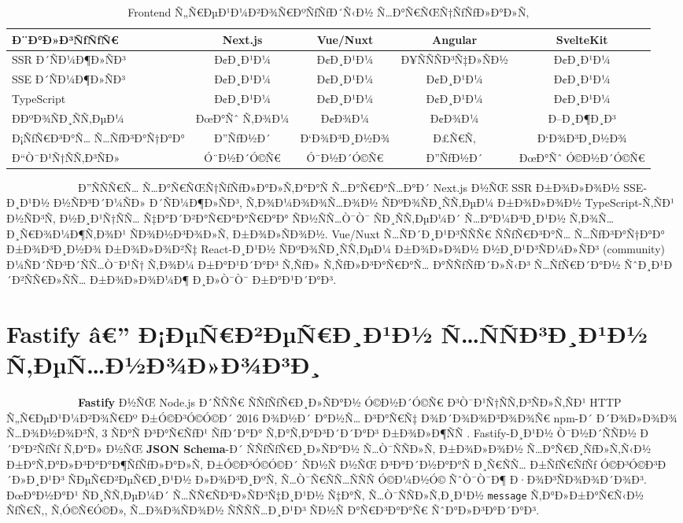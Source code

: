 \documentclass[12pt,A4]{report}
\begin{document}
\begin{table}[h]
\centering
\caption{Frontend Ñ„Ñ€ÐµÐ¹Ð¼Ð²Ð¾Ñ€ÐºÑƒÑƒÐ´Ñ‹Ð½ Ñ…Ð°Ñ€ÑŒÑ†ÑƒÑƒÐ»Ð°Ð»Ñ‚}
\begin{tabular}{|l|c|c|c|c|}
\hline
\textbf{Ð¨Ð°Ð»Ð³ÑƒÑƒÑ€} & \textbf{Next.js} & \textbf{Vue/Nuxt} &
\textbf{Angular} & \textbf{SvelteKit} \\
\hline
SSR Ð´ÑÐ¼Ð¶Ð»ÑÐ³        & Ð¢Ð¸Ð¹Ð¼   & Ð¢Ð¸Ð¹Ð¼   & Ð¥ÑÑÑÐ³Ñ‡Ð»ÑÐ½ & Ð¢Ð¸Ð¹Ð¼ \\
SSE Ð´ÑÐ¼Ð¶Ð»ÑÐ³        & Ð¢Ð¸Ð¹Ð¼   & Ð¢Ð¸Ð¹Ð¼   & Ð¢Ð¸Ð¹Ð¼       & Ð¢Ð¸Ð¹Ð¼ \\
TypeScript         & Ð¢Ð¸Ð¹Ð¼   & Ð¢Ð¸Ð¹Ð¼   & Ð¢Ð¸Ð¹Ð¼       & Ð¢Ð¸Ð¹Ð¼ \\
Ð­ÐºÐ¾ÑÐ¸ÑÑ‚ÐµÐ¼          & ÐœÐ°Ñˆ Ñ‚Ð¾Ð¼ & Ð¢Ð¾Ð¼    & Ð¢Ð¾Ð¼        & Ð–Ð¸Ð¶Ð¸Ð³ \\
Ð¡ÑƒÑ€Ð³Ð°Ñ… Ñ…ÑƒÐ³Ð°Ñ†Ð°Ð°     & Ð”ÑƒÐ½Ð´   & Ð‘Ð¾Ð³Ð¸Ð½Ð¾ & Ð£Ñ€Ñ‚        & Ð‘Ð¾Ð³Ð¸Ð½Ð¾ \\
Ð“Ò¯Ð¹Ñ†ÑÑ‚Ð³ÑÐ»         & Ó¨Ð½Ð´Ó©Ñ€  & Ó¨Ð½Ð´Ó©Ñ€  & Ð”ÑƒÐ½Ð´       & ÐœÐ°Ñˆ Ó©Ð½Ð´Ó©Ñ€ \\
\hline
\end{tabular}
\label{tab:frontend_comparison}
\end{table}

\ \ \ \ \ \ \ \ \  \ \ \ \ Ð”ÑÑÑ€Ñ… Ñ…Ð°Ñ€ÑŒÑ†ÑƒÑƒÐ»Ð°Ð»Ñ‚Ð°Ð°Ñ Ñ…Ð°Ñ€Ð°Ñ…Ð°Ð´ Next.js Ð½ÑŒ
SSR Ð±Ð¾Ð»Ð¾Ð½ SSE-Ð¸Ð¹Ð½ Ð½ÑÐ³Ð´Ð¼ÑÐ» Ð´ÑÐ¼Ð¶Ð»ÑÐ³, Ñ‚Ð¾Ð¼Ð¾Ð¾Ñ…Ð¾Ð½ ÑÐºÐ¾ÑÐ¸ÑÑ‚ÐµÐ¼ Ð±Ð¾Ð»Ð¾Ð½
TypeScript-Ñ‚ÑÐ¹ Ð½ÑÐ³Ñ‚ Ð½Ð¸Ð¹Ñ†ÑÑ… Ñ‡Ð°Ð´Ð²Ð°Ñ€Ð°Ð°Ñ€Ð°Ð° ÑÐ½ÑÑ…Ò¯Ò¯ ÑÐ¸ÑÑ‚ÐµÐ¼Ð´ Ñ…Ð°Ð¼Ð³Ð¸Ð¹Ð½
Ñ‚Ð¾Ñ…Ð¸Ñ€Ð¾Ð¼Ð¶Ñ‚Ð¾Ð¹ ÑÐ¾Ð½Ð³Ð¾Ð»Ñ‚ Ð±Ð¾Ð»ÑÐ¾Ð½. Vue/Nuxt Ñ…ÑÐ´Ð¸Ð¹Ð³ÑÑÑ€ ÑÑƒÑ€Ð³Ð°Ñ… Ñ…ÑƒÐ³Ð°Ñ†Ð°Ð° Ð±Ð¾Ð³Ð¸Ð½Ð¾
Ð±Ð¾Ð»Ð¾Ð²Ñ‡ React-Ð¸Ð¹Ð½ ÑÐºÐ¾ÑÐ¸ÑÑ‚ÐµÐ¼ Ð±Ð¾Ð»Ð¾Ð½ Ð½Ð¸Ð¹Ð³ÑÐ¼Ð»ÑÐ³ (community) Ð¼ÑÐ´ÑÐ³Ð´ÑÑ…Ò¯Ð¹Ñ†
Ñ‚Ð¾Ð¼ Ð±Ð°Ð¹Ð´Ð°Ð³ Ñ‚ÑƒÐ» Ñ‚ÑƒÐ»Ð³Ð°Ñ€Ð°Ñ… Ð°ÑÑƒÑƒÐ´Ð»Ñ‹Ð³ Ñ…ÑƒÑ€Ð´Ð°Ð½ ÑˆÐ¸Ð¹Ð´Ð²ÑÑ€Ð»ÑÑ… Ð±Ð¾Ð»Ð¾Ð¼Ð¶ Ð¸Ð»Ò¯Ò¯
Ð±Ð°Ð¹Ð´Ð°Ð³.

\section{Fastify â€” Ð¡ÐµÑ€Ð²ÐµÑ€Ð¸Ð¹Ð½ Ñ…ÑÑÐ³Ð¸Ð¹Ð½ Ñ‚ÐµÑ…Ð½Ð¾Ð»Ð¾Ð³Ð¸}

\ \ \ \ \ \ \ \ \  \ \ \ \ \textbf{Fastify} Ð½ÑŒ Node.js Ð´ÑÑÑ€ ÑÑƒÑƒÑ€Ð¸Ð»ÑÐ°Ð½
Ó©Ð½Ð´Ó©Ñ€ Ð³Ò¯Ð¹Ñ†ÑÑ‚Ð³ÑÐ»Ñ‚ÑÐ¹ HTTP Ñ„Ñ€ÐµÐ¹Ð¼Ð²Ð¾Ñ€Ðº Ð±Ó©Ð³Ó©Ó©Ð´ 2016 Ð¾Ð½Ð´ Ð°Ð½Ñ… Ð³Ð°Ñ€Ñ‡
Ð¾Ð´Ð¾Ð¾Ð³Ð¾Ð¾Ñ€ npm-Ð´ Ð´Ð¾Ð»Ð¾Ð¾ Ñ…Ð¾Ð½Ð¾Ð³Ñ‚ 3 ÑÐ°Ñ Ð³Ð°Ñ€ÑƒÐ¹ ÑƒÐ´Ð°Ð° Ñ‚Ð°Ñ‚Ð°Ð³Ð´Ð´Ð°Ð³ Ð±Ð¾Ð»Ð¶ÑÑ
\cite{fastify2024}. Fastify-Ð¸Ð¹Ð½ Ò¯Ð½Ð´ÑÑÐ½ Ð´Ð°Ð²ÑƒÑƒ Ñ‚Ð°Ð» Ð½ÑŒ
\textbf{JSON Schema}-Ð´ ÑÑƒÑƒÑ€Ð¸Ð»ÑÐ°Ð½ Ñ…Ò¯ÑÑÐ»Ñ‚ Ð±Ð¾Ð»Ð¾Ð½ Ñ…Ð°Ñ€Ð¸ÑƒÐ»Ñ‚Ñ‹Ð½
Ð±Ð°Ñ‚Ð°Ð»Ð³Ð°Ð°Ð¶ÑƒÑƒÐ»Ð°Ð»Ñ‚ Ð±Ó©Ð³Ó©Ó©Ð´ ÑÐ½Ñ Ð½ÑŒ Ð³Ð°Ð´Ð½Ð°Ð°Ñ Ð¸Ñ€ÑÑ… Ð±ÑƒÑ€ÑƒÑƒ Ó©Ð³Ó©Ð³Ð´Ð»Ð¸Ð¹Ð³
ÑÐµÑ€Ð²ÐµÑ€Ð¸Ð¹Ð½ Ð»Ð¾Ð³Ð¸ÐºÑ‚ Ñ…Ò¯Ñ€ÑÑ…ÑÑÑ Ó©Ð¼Ð½Ó© ÑˆÒ¯Ò¯Ð¶ Ð·Ð¾Ð³ÑÐ¾Ð¾Ð´Ð¾Ð³. ÐœÐ°Ð½Ð°Ð¹ ÑÐ¸ÑÑ‚ÐµÐ¼Ð´
Ñ…ÑÑ€ÑÐ³Ð»ÑÐ³Ñ‡Ð¸Ð¹Ð½ Ñ‡Ð°Ñ‚ Ñ…Ò¯ÑÑÐ»Ñ‚Ð¸Ð¹Ð½ \texttt{message} Ñ‚Ð°Ð»Ð±Ð°Ñ€Ñ‹Ð½ ÑƒÑ€Ñ‚, Ñ‚Ó©Ñ€Ó©Ð»,
Ñ…Ð¾Ð¾ÑÐ¾Ð½ ÑÑÑÑ…Ð¸Ð¹Ð³ ÑÐ½Ñ Ð°Ñ€Ð³Ð°Ð°Ñ€ ÑˆÐ°Ð»Ð³Ð°Ð´Ð°Ð³.
\end{document}
